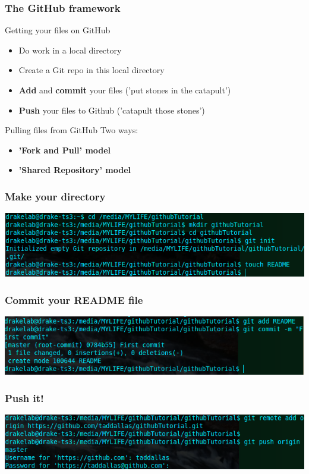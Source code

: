 \documentclass{beamer}\usepackage{graphicx, color}
\begin{document}
\begin{frame}
 \frametitle{The GitHub framework}
\begin{block}{Getting your files on GitHub}
\begin{itemize}
 \item Do work in a local directory
 \item Create a Git repo in this local directory 
 \item \textbf{Add} and \textbf{commit} your files ('put stones in the catapult')
 \item \textbf{Push} your files to Github ('catapult those stones')
\end{itemize}
\end{block}

\begin{block}{Pulling files from GitHub}
Two ways:
\begin{itemize}
 \item \textbf{'Fork and Pull' model}
 \item \textbf{'Shared Repository' model}
\end{itemize}
\end{block}
\end{frame}


\begin{frame}
 \frametitle{\textbf{Make your directory}}
 \includegraphics[width=\textwidth]{mkdir.png}\\
\end{frame}


\begin{frame}
\frametitle{\textbf{Commit your README file}}
 \includegraphics[width=\textwidth]{add.png}\\
\end{frame}


\begin{frame}
\frametitle{\textbf{Push it!}}
 \includegraphics[width=\textwidth]{push.png}\\
\end{frame}
\end{document}
